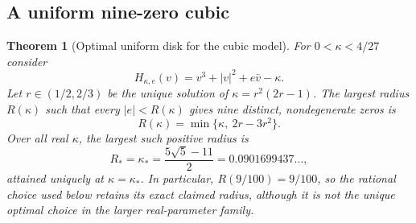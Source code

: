 \documentclass[UTF8,11pt]{ctexart}
\newtheorem{thm}{Theorem}[section]
\theoremstyle{definition}
\numberwithin{equation}{section}
\begin{document}
\subsection{A uniform nine-zero cubic}\label{c:sec:model}

\begin{thm}[Optimal uniform disk for the cubic model]\label{v6:thm:cubicradius}
For $0<\kappa<4/27$ consider
\[
 H_{\kappa,e}(v)=v^3+|v|^2+e\bar v-\kappa.
\]
Let $r\in(1/2,2/3)$ be the unique solution of
$\kappa=r^2(2r-1)$. The largest radius $R(\kappa)$ such that
every $|e|<R(\kappa)$ gives nine distinct, nondegenerate zeros is
\begin{equation}\label{v6:eq:cubicradius}
 R(\kappa)=\min\{\kappa,\ 2r-3r^2\}.
\end{equation}
Over all real $\kappa$, the largest such positive radius is
\begin{equation}\label{v6:eq:optimalconstant}
 R_* =\kappa_* =\frac{5\sqrt5-11}{2}
       =0.0901699437\ldots,
\end{equation}
attained uniquely at $\kappa=\kappa_*$. In particular,
$R(9/100)=9/100$, so the rational choice used below retains
its exact claimed radius, although it is not the unique optimal
choice in the larger real-parameter family.
\end{thm}
\end{document}
